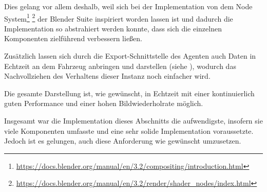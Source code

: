 Dies gelang vor allem deshalb, weil sich bei der Implementation von dem Node System\footnote{\url{https://docs.blender.org/manual/en/3.2/compositing/introduction.html}} \footnote{\url{
https://docs.blender.org/manual/en/3.2/render/shader_nodes/index.html}} der Blender Suite inspiriert worden lassen ist und dadurch die Implementation so abstrahiert werden konnte, dass sich die einzelnen Komponenten zielführend verbessern ließen.

Zusätzlich lassen sich durch die Export-Schnittstelle des Agenten auch Daten in Echtzeit an dem Fahrzeug anbringen und darstellen (siehe ), wodurch das Nachvollziehen des Verhaltens dieser Instanz noch einfacher wird.

Die gesamte Darstellung ist, wie gewünscht, in Echtzeit mit einer kontinuierlich guten Performance und einer hohen Bildwiederholrate möglich.

Insgesamt war die Implementation dieses Abschnitts die aufwendigste, insofern sie viele Komponenten umfasste und eine sehr solide Implementation voraussetzte.
Jedoch ist es gelungen, auch diese Anforderung wie gewünscht umzusetzen.
